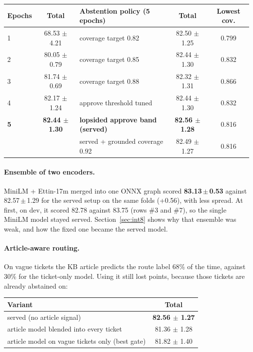 \documentclass[10pt,a4paper]{article}
\begin{document}
\begin{center}
\begin{tabular}{lc@{\hspace{2.5em}}lcc}
\toprule
Epochs & Total & Abstention policy (5 epochs) & Total & Lowest cov. \\
\midrule
1 & 68.53 $\pm$ 4.21 & coverage target 0.82 & 82.50 $\pm$ 1.25 & 0.799 \\
2 & 80.05 $\pm$ 0.79 & coverage target 0.85 & 82.44 $\pm$ 1.30 & 0.832 \\
3 & 81.74 $\pm$ 0.69 & coverage target 0.88 & 82.32 $\pm$ 1.31 & 0.866 \\
4 & 82.17 $\pm$ 1.24 & approve threshold tuned & 82.44 $\pm$ 1.30 & 0.832 \\
\textbf{5} & \textbf{82.44 $\pm$ 1.30} & \cellcolor{served}\textbf{lopsided approve band (served)} & \cellcolor{served}\textbf{82.56 $\pm$ 1.28} & \cellcolor{served}0.816 \\
 & & served + grounded coverage 0.92 & 82.49 $\pm$ 1.27 & 0.816 \\
\bottomrule
\end{tabular}
\end{center}

\paragraph{Ensemble of two encoders.} MiniLM + Ettin-17m merged into one ONNX graph scored
\textbf{83.13\,$\pm$\,0.53} against 82.57\,$\pm$\,1.29 for the served setup on the same folds
(+0.56), with less spread. At first, on dev, it scored 82.78 against 83.75 (rows \#3 and \#7),
so the single MiniLM model stayed served. Section~\ref{sec:int8} shows why that ensemble was
weak, and how the fixed one became the served model.

\paragraph{Article-aware routing.} On vague tickets the KB article predicts the route label
68\% of the time, against 30\% for the ticket-only model. Using it still lost points,
because those tickets are already abstained on:

\begin{center}
\begin{tabular}{lc}
\toprule
Variant & Total \\
\midrule
\rowcolor{served} served (no article signal) & \textbf{82.56 $\pm$ 1.27} \\
article model blended into every ticket & 81.36 $\pm$ 1.28 \\
article model on vague tickets only (best gate) & 81.82 $\pm$ 1.40 \\
\bottomrule
\end{tabular}
\end{center}
\end{document}

